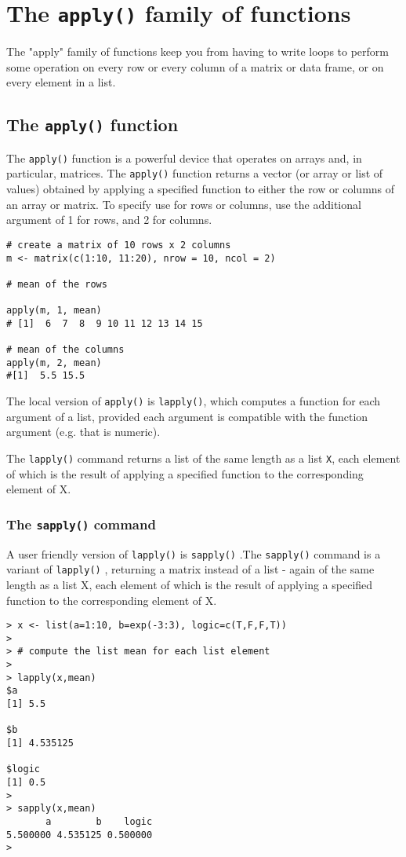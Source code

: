 \documentclass[a4paper,12pt]{article}
\begin{document}
\section*{The \texttt{apply()} family of functions}

The "apply" family of functions keep you from having to write loops to perform 
some operation on every row or every column of a matrix or data frame, or on 
every element in a list.

\subsection*{The \texttt{apply()} function}
The \texttt{apply()} function is a powerful device that operates on arrays and,
 in particular, matrices.
The \texttt{apply()} function returns a vector (or array or list of values) 
obtained by applying a specified function to either the row or columns of 
an array or matrix.
To specify use for rows or columns, use the additional argument of 1 for rows, 
and 2 for columns.
\begin{framed}
\begin{verbatim}
# create a matrix of 10 rows x 2 columns
m <- matrix(c(1:10, 11:20), nrow = 10, ncol = 2)

# mean of the rows

apply(m, 1, mean)
# [1]  6  7  8  9 10 11 12 13 14 15

# mean of the columns
apply(m, 2, mean)
#[1]  5.5 15.5
\end{verbatim}
\end{framed}

The local version of \texttt{apply()} is \texttt{lapply()}, which computes a function for each 
argument of a list, provided each argument is compatible with the function argument (e.g. that is numeric).

The \texttt{lapply()} command returns a list of the same length as a list \texttt{X}, each 
element of which is the result of applying a specified function to 
the corresponding element of X.

\subsubsection*{The \texttt{sapply()} command}
A user friendly version of  \texttt{lapply()}  is  \texttt{sapply()} .The \texttt{sapply()} command  is a variant of \texttt{lapply()} , returning a matrix 
instead of a list - again of the same length as a list X, 
each element of which is the result of applying a specified function to the
 corresponding element of X.
\begin{verbatim}
> x <- list(a=1:10, b=exp(-3:3), logic=c(T,F,F,T))
>
> # compute the list mean for each list element
>
> lapply(x,mean)
$a
[1] 5.5

$b
[1] 4.535125

$logic
[1] 0.5
>
> sapply(x,mean)
       a        b    logic
5.500000 4.535125 0.500000
>
\end{verbatim}
\end{document}

